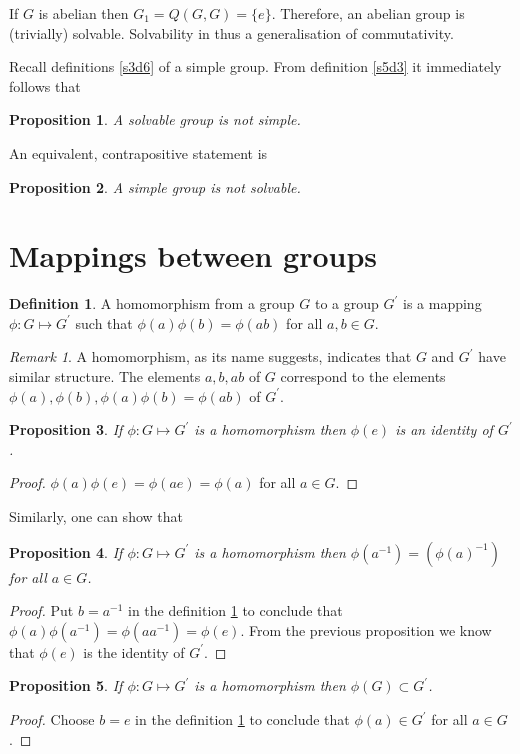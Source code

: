 \documentclass{article}
\theoremstyle{plain}
\numberwithin{thm}{section}
\theoremstyle{plain}
\newtheorem{prop}{Proposition}
\numberwithin{prop}{section}
\theoremstyle{definition}
\newtheorem{defn}{Definition}
\numberwithin{defn}{section}
\theoremstyle{remark}
\newtheorem*{rem}{Remark}
\numberwithin{equation}{section}
\begin{document}
If $G$ is abelian then $G_1 = Q(G, G) = \{e\}$. Therefore, an abelian group
is (trivially) solvable. Solvability in thus a generalisation of commutativity.

Recall definitions \ref{s3d6} of a simple group. From definition \ref{s5d3}
it immediately follows that
\begin{prop}\label{s5e7}
A solvable group is not simple.
\end{prop}
An equivalent, contrapositive statement is
\begin{prop}\label{s5e8}
A simple group is not solvable.
\end{prop}

\section{Mappings between groups}\label{s6}
\begin{defn}\label{s6d1}
A homomorphism from a group $G$ to a group $G^\prime$ is a mapping $\phi: G
\mapsto G^\prime$ such that $\phi(a)\phi(b) = \phi(ab)$ for all $a, b \in G$.
\end{defn}
\begin{rem}
A homomorphism, as its name suggests, indicates that $G$ and $G^\prime$ have
similar structure. The elements $a, b, ab$ of $G$ correspond to the elements
$\phi(a), \phi(b), \phi(a)\phi(b) = \phi(ab)$ of $G^\prime$. 
\end{rem}

\begin{prop}\label{s6p1}
If $\phi: G \mapsto G^\prime$ is a homomorphism then $\phi(e)$ is an identity
of $G^\prime$.
\end{prop}
\begin{proof}
$\phi(a)\phi(e) = \phi(ae) = \phi(a)$ for all $a \in G$.
\end{proof}

Similarly, one can show that
\begin{prop}\label{s6p2}
If $\phi: G \mapsto G^\prime$ is a homomorphism then $\phi(a^{-1}) = 
(\phi(a)^{-1})$ for all $a \in G$.
\end{prop}
\begin{proof}
Put $b = a^{-1}$ in the definition \ref{s6d1} to conclude that $\phi(a)
\phi(a^{-1}) = \phi(aa^{-1}) = \phi(e)$. From the previous proposition we 
know that $\phi(e)$ is the identity of $G^\prime$.
\end{proof}

\begin{prop}\label{s6p3}
If $\phi: G \mapsto G^\prime$ is a homomorphism then $\phi(G) \subset G^\prime$.
\end{prop}
\begin{proof}
Choose $b = e$ in the definition \ref{s6d1} to conclude that $\phi(a) \in
G^\prime$ for all $a \in G$.
\end{proof}
\end{document}
